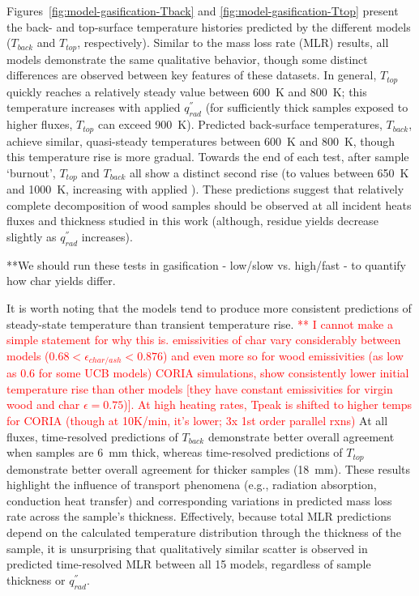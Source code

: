 \documentclass{article}
\begin{document}
Figures~\ref{fig:model-gasification-Tback} and \ref{fig:model-gasification-Ttop} present the back- and top-surface temperature histories predicted by the different models ($T_{back}$ and $T_{top}$, respectively). Similar to the mass loss rate (MLR) results, all models demonstrate the same qualitative behavior, though some distinct differences are observed between key features of these datasets. In general, $T_{top}$ quickly reaches a relatively steady value between 600~K and 800~K; this temperature increases with applied $q^{''}_{rad}$ (for sufficiently thick samples exposed to higher fluxes, $T_{top}$ can exceed 900~K). Predicted back-surface temperatures, $T_{back}$, achieve similar, quasi-steady temperatures between 600~K and 800~K, though this temperature rise is more gradual. Towards the end of each test, after sample `burnout', $T_{top}$ and $T_{back}$ all show a distinct second rise (to values between 650~K and 1000~K, increasing with applied ). These predictions suggest that relatively complete decomposition of wood samples should be observed at all incident heats fluxes and thickness studied in this work (although, residue yields decrease slightly as $q^{''}_{rad}$ increases). 

**We should run these tests in gasification - low/slow vs. high/fast - to quantify how char yields differ.
 
 It is worth noting that the models tend to produce more consistent predictions of steady-state temperature than transient temperature rise. \textcolor{red}{** I cannot make a simple statement for why this is. emissivities of char vary considerably between models ($ 0.68 < \epsilon_{char/ash}< 0.876 $) and even more so for wood emissivities (as low as 0.6 for some UCB models)
 CORIA simulations, show consistently lower initial temperature rise than other models [they have constant emissivities for virgin wood and char $\epsilon=0.75$)]. At high heating rates, Tpeak is shifted to higher temps for CORIA (though at 10K/min, it's lower; 3x 1st order parallel rxns)}
 At all fluxes, time-resolved predictions of $T_{back}$ demonstrate better overall agreement when samples are 6~mm thick, whereas time-resolved predictions of $T_{top}$ demonstrate better overall agreement for thicker samples (18~mm). These results highlight the influence of transport phenomena (e.g., radiation absorption, conduction heat transfer) and corresponding variations in predicted mass loss rate across the sample's thickness.  Effectively, because total MLR predictions depend on the calculated temperature distribution through the thickness of the sample, it is unsurprising that qualitatively similar scatter is observed in predicted time-resolved MLR between all 15 models, regardless of sample thickness or $q^{''}_{rad}$.
  
\end{document}

